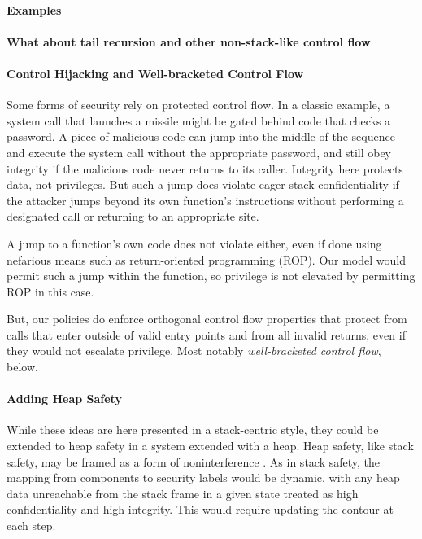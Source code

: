 \documentclass[acmsmall,review,anonymous]{acmart}\settopmatter{printfolios=true,printccs=false,printacmref=false}
\begin{document}
  \paragraph{Examples}


  \paragraph{What about tail recursion and other non-stack-like control flow}

  \paragraph{Control Hijacking and Well-bracketed Control Flow}
  
    Some forms of security rely on protected control flow. In a classic
    example, a system call that launches a missile might be gated behind code
    that checks a password. A piece of malicious code can jump into the middle
    of the sequence and execute the system call without the appropriate password,
    and still obey integrity if the malicious code never returns to its caller.
    Integrity here protects data, not privileges. But such a jump does violate
    eager stack confidentiality if the attacker jumps beyond its own function's
    instructions without performing a designated call or returning to an
    appropriate site.

    A jump to a function's own code does not violate either, even if done using
    nefarious means such as return-oriented programming (ROP). Our model would
    permit such a jump within the function, so privilege is not elevated by
    permitting ROP in this case.

    But, our policies do enforce orthogonal control flow properties that
    protect from calls that enter outside of valid entry points and from all
    invalid returns, even if they would not escalate privilege. Most notably
    {\em well-bracketed control flow}, below.

  \paragraph{Adding Heap Safety}

    While these ideas are here presented in a stack-centric style, they could
    be extended to heap safety in a system extended with a heap. Heap safety,
    like stack safety, may be framed as a form of noninterference
    \cite{AzevedoDeAmorim17}. As in stack safety, the mapping from components
    to security labels would be dynamic, with any heap data unreachable from
    the stack frame in a given state treated as high confidentiality and high
    integrity. This would require updating the contour at each step.
\end{document}
